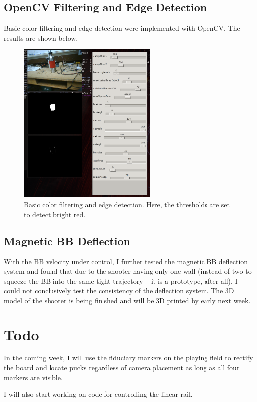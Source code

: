\documentclass[12pt,letterpaper]{article}
\begin{document}
\subsection*{OpenCV Filtering and Edge Detection}

Basic color filtering and edge detection were implemented with OpenCV. The
results are shown below.

\begin{figure}[!h]
	\centering
	\includegraphics[width=0.6\textwidth]{vision.png}
	\caption{Basic color filtering and edge detection. Here, the thresholds are
	set to detect bright red.}
	\label{fig:vision}
\end{figure}


\subsection*{Magnetic BB Deflection}

With the BB velocity under control, I further tested the magnetic BB deflection
system and found that due to the shooter having only one wall (instead of two
to squeeze the BB into the same tight trajectory -- it is a prototype, after
all), I could not conclusively test the consistency of the deflection system.
The 3D model of the shooter is being finished and will be 3D printed by early
next week.

\section*{Todo}

In the coming week, I will use the fiduciary markers on the playing field to
rectify the board and locate pucks regardless of camera placement as long as
all four markers are visible.

I will also start working on code for controlling the linear rail.
\end{document}
